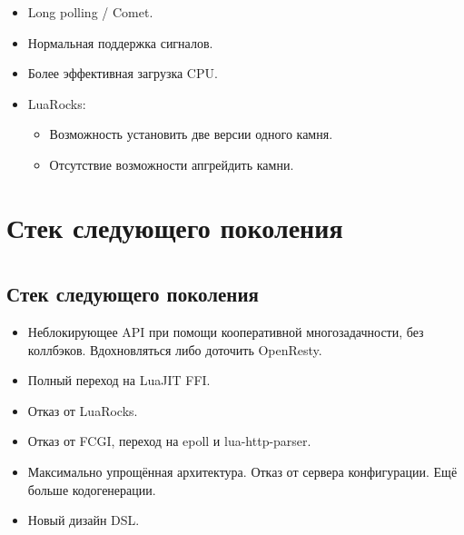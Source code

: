 \documentclass[aspectratio=169,handout,bigger]{beamer}
\begin{document}
\begin{frame}
  \begin{itemize}
    \item Long polling / Comet.
    \item Нормальная поддержка сигналов.
    \item Более эффективная загрузка CPU.
    \item LuaRocks:
    \begin{itemize}
      \item Возможность установить две версии одного камня.
      \item Отсутствие возможности апгрейдить камни.
    \end{itemize}
  \end{itemize}
\end{frame}


\section{Стек следующего поколения}


\section*{}
\subsection*{Стек следующего поколения}

\begin{frame}
  \begin{itemize}
    \item Неблокирующее API при помощи кооперативной многозадачности, без коллбэков. Вдохновляться либо доточить OpenResty.
    \item Полный переход на LuaJIT FFI.
    \item Отказ от LuaRocks.
    \item Отказ от FCGI, переход на epoll и lua-http-parser.
    \item Максимально упрощённая архитектура. Отказ от сервера конфигурации. Ещё больше кодогенерации.
    \item Новый дизайн DSL.
  \end{itemize}
\end{frame}
\end{document}
